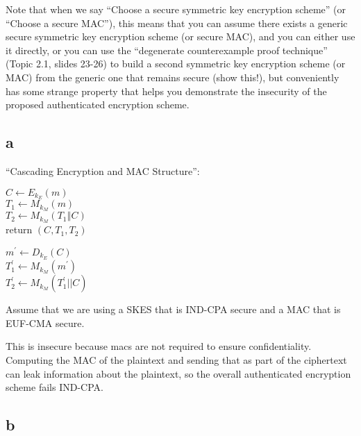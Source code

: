 \documentclass[11pt]{article}
\begin{document}
Note that when we say “Choose a secure symmetric key encryption scheme” (or “Choose a secure MAC”), this means that you can assume there exists a generic secure symmetric key encryption scheme (or secure MAC), and you can either use it directly, or you can use the “degenerate counterexample proof technique” (Topic 2.1, slides 23-26) to build a second symmetric key encryption scheme (or MAC) from the generic one that remains secure (show this!), but conveniently has some strange property that helps you demonstrate the insecurity of the proposed authenticated encryption scheme.

\subsection{a}

“Cascading Encryption and MAC Structure”:

\begin{algorithm}
    \caption{$AEON(k = (k_E, k_M), m)$}
    $C \leftarrow E_{k_E}(m)$ \\
    $T_1 \leftarrow M_{k_M}(m)$ \\
    $T_2 \leftarrow M_{k_M}(T_1 \mathbin\Vert C)$ \\
    return $(C, T_1, T_2)$
\end{algorithm}

\begin{algorithm}
    \caption{$AEON_{dec}((k_E, k_m), (C, T_1, T_2))$}
    $m^\prime \leftarrow D_{k_E}(C)$ \\
    $T_1^\prime \leftarrow M_{k_M}(m^\prime)$ \\
    $T_2^\prime \leftarrow M_{k_M}(T_1^\prime || C)$ \\
     
\end{algorithm}    

Assume that we are using a SKES that is IND-CPA secure and a MAC that is EUF-CMA secure.

This is insecure because macs are not required to ensure confidentiality. Computing the MAC of the plaintext and sending that as part of the ciphertext can leak information about the plaintext, so the overall authenticated encryption scheme fails IND-CPA.

\newpage

\subsection{b}
\end{document}
